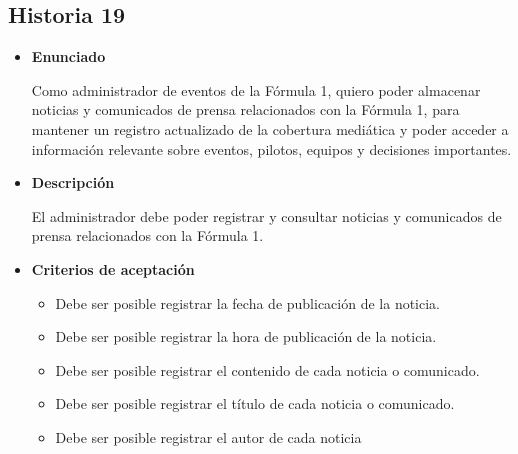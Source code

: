 \documentclass{article}
\begin{document}
	\subsection{Historia 19}
	\begin{itemize}
		
		\item \large{\textbf{Enunciado}}
		\begin{description}
Como administrador de eventos de la Fórmula 1, quiero poder almacenar noticias y comunicados de prensa relacionados con la Fórmula 1, para mantener un registro actualizado de la cobertura mediática y poder acceder a información relevante sobre eventos, pilotos, equipos y decisiones importantes.

		\end{description}
		
		\item \large{\textbf{Descripción}}
		\begin{description}
El administrador debe poder registrar y consultar noticias y comunicados de prensa relacionados con la Fórmula 1. 

		\end{description}
		
		\item \large{\textbf{Criterios de aceptación}}
		\begin{itemize}
			\item Debe ser posible registrar la fecha de publicación de la noticia.
			\item Debe ser posible registrar la hora de publicación de la noticia.
			\item Debe ser posible registrar el contenido de cada noticia o comunicado.
			\item Debe ser posible registrar el título de cada noticia o comunicado. 
			\item Debe ser posible registrar el autor de cada noticia
			
		\end{itemize}
		
	\end{itemize}
	
\end{document}
